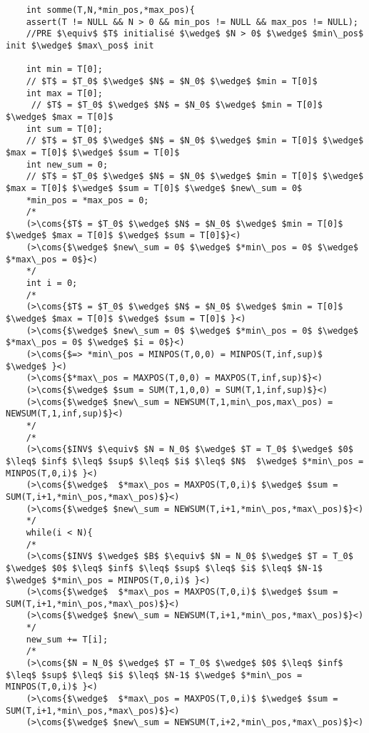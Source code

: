 \begin{lstlisting}
    int somme(T,N,*min_pos,*max_pos){
    assert(T != NULL && N > 0 && min_pos != NULL && max_pos != NULL);
    //PRE $\equiv$ $T$ initialisé $\wedge$ $N > 0$ $\wedge$ $min\_pos$ init $\wedge$ $max\_pos$ init
    
    int min = T[0];
    // $T$ = $T_0$ $\wedge$ $N$ = $N_0$ $\wedge$ $min = T[0]$
    int max = T[0];
     // $T$ = $T_0$ $\wedge$ $N$ = $N_0$ $\wedge$ $min = T[0]$ $\wedge$ $max = T[0]$
    int sum = T[0];
    // $T$ = $T_0$ $\wedge$ $N$ = $N_0$ $\wedge$ $min = T[0]$ $\wedge$ $max = T[0]$ $\wedge$ $sum = T[0]$
    int new_sum = 0;
    // $T$ = $T_0$ $\wedge$ $N$ = $N_0$ $\wedge$ $min = T[0]$ $\wedge$ $max = T[0]$ $\wedge$ $sum = T[0]$ $\wedge$ $new\_sum = 0$
    *min_pos = *max_pos = 0;
    /*
    (>\coms{$T$ = $T_0$ $\wedge$ $N$ = $N_0$ $\wedge$ $min = T[0]$ $\wedge$ $max = T[0]$ $\wedge$ $sum = T[0]$}<)
    (>\coms{$\wedge$ $new\_sum = 0$ $\wedge$ $*min\_pos = 0$ $\wedge$ $*max\_pos = 0$}<)
    */
    int i = 0;
    /*
    (>\coms{$T$ = $T_0$ $\wedge$ $N$ = $N_0$ $\wedge$ $min = T[0]$ $\wedge$ $max = T[0]$ $\wedge$ $sum = T[0]$ }<)
    (>\coms{$\wedge$ $new\_sum = 0$ $\wedge$ $*min\_pos = 0$ $\wedge$ $*max\_pos = 0$ $\wedge$ $i = 0$}<)
    (>\coms{$=> *min\_pos = MINPOS(T,0,0) = MINPOS(T,inf,sup)$ $\wedge$ }<)
    (>\coms{$*max\_pos = MAXPOS(T,0,0) = MAXPOS(T,inf,sup)$}<)
    (>\coms{$\wedge$ $sum = SUM(T,1,0,0) = SUM(T,1,inf,sup)$}<)
    (>\coms{$\wedge$ $new\_sum = NEWSUM(T,1,min\_pos,max\_pos) = NEWSUM(T,1,inf,sup)$}<)
    */
    /*
    (>\coms{$INV$ $\equiv$ $N = N_0$ $\wedge$ $T = T_0$ $\wedge$ $0$ $\leq$ $inf$ $\leq$ $sup$ $\leq$ $i$ $\leq$ $N$  $\wedge$ $*min\_pos = MINPOS(T,0,i)$ }<)
    (>\coms{$\wedge$  $*max\_pos = MAXPOS(T,0,i)$ $\wedge$ $sum = SUM(T,i+1,*min\_pos,*max\_pos)$}<)
    (>\coms{$\wedge$ $new\_sum = NEWSUM(T,i+1,*min\_pos,*max\_pos)$}<)
    */
    while(i < N){
    /*
    (>\coms{$INV$ $\wedge$ $B$ $\equiv$ $N = N_0$ $\wedge$ $T = T_0$ $\wedge$ $0$ $\leq$ $inf$ $\leq$ $sup$ $\leq$ $i$ $\leq$ $N-1$ $\wedge$ $*min\_pos = MINPOS(T,0,i)$ }<)
    (>\coms{$\wedge$  $*max\_pos = MAXPOS(T,0,i)$ $\wedge$ $sum = SUM(T,i+1,*min\_pos,*max\_pos)$}<)
    (>\coms{$\wedge$ $new\_sum = NEWSUM(T,i+1,*min\_pos,*max\_pos)$}<)
    */
    new_sum += T[i];
    /*
    (>\coms{$N = N_0$ $\wedge$ $T = T_0$ $\wedge$ $0$ $\leq$ $inf$ $\leq$ $sup$ $\leq$ $i$ $\leq$ $N-1$ $\wedge$ $*min\_pos = MINPOS(T,0,i)$ }<)
    (>\coms{$\wedge$  $*max\_pos = MAXPOS(T,0,i)$ $\wedge$ $sum = SUM(T,i+1,*min\_pos,*max\_pos)$}<)
    (>\coms{$\wedge$ $new\_sum = NEWSUM(T,i+2,*min\_pos,*max\_pos)$}<)

\end{lstlisting}
